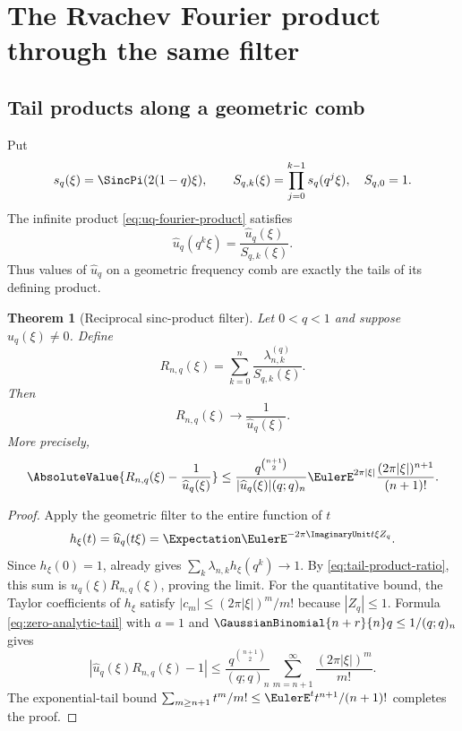 \documentclass[11pt,a4paper,oneside]{article}
\newtheorem{theorem}{Theorem}[section]
\theoremstyle{definition}
\theoremstyle{remark}
\begin{document}
\section{The Rvachev Fourier product through the same filter}
\label{sec:rvachev-filter}

\subsection{Tail products along a geometric comb}

Put
\begin{equation}
 s_q(\xi)=\SincPi(2(1-q)\xi),
 \qquad
 S_{q,k}(\xi)=\prod_{j=0}^{k-1}s_q(q^j\xi),
 \quad S_{q,0}=1.
 \label{eq:prefix-products}
\end{equation}
The infinite product \eqref{eq:uq-fourier-product} satisfies
\begin{equation}
 \widehat u_q(q^k\xi)
 =\frac{\widehat u_q(\xi)}{S_{q,k}(\xi)}.
 \label{eq:tail-product-ratio}
\end{equation}
Thus values of $\widehat u_q$ on a geometric frequency comb are exactly the
tails of its defining product.

\begin{theorem}[Reciprocal sinc-product filter]
\label{thm:reciprocal-product}
Let $0<q<1$ and suppose $\widehat u_q(\xi)\ne0$.  Define
\begin{equation}
 R_{n,q}(\xi)=\sum_{k=0}^n
 \frac{\lambda_{n,k}^{(q)}}{S_{q,k}(\xi)}.
 \label{eq:reciprocal-approximant}
\end{equation}
Then
\begin{equation}
 R_{n,q}(\xi)\longrightarrow\frac1{\widehat u_q(\xi)}.
 \label{eq:reciprocal-limit}
\end{equation}
More precisely,
\begin{equation}
 \AbsoluteValue{R_{n,q}(\xi)-\frac1{\widehat u_q(\xi)}}
 \le
 \frac{q^{\binom{n+1}{2}}}{|\widehat u_q(\xi)|(q;q)_n}
 \EulerE^{2\pi|\xi|}\frac{(2\pi|\xi|)^{n+1}}{(n+1)!}.
 \label{eq:reciprocal-error-bound}
\end{equation}
\end{theorem}

\begin{proof}
Apply the geometric filter to the entire function of $t$
\[
 h_\xi(t)=\widehat u_q(t\xi)=\Expectation\EulerE^{-2\pi\ImaginaryUnit t\xi Z_q}.
\]
Since $h_\xi(0)=1$,  already gives
$\sum_k\lambda_{n,k}h_\xi(q^k)\to1$.  By
\eqref{eq:tail-product-ratio}, this sum is
$\widehat u_q(\xi)R_{n,q}(\xi)$, proving the limit.
For the quantitative bound, the Taylor coefficients of $h_\xi$ satisfy
$|c_m|\le(2\pi|\xi|)^m/m!$ because $|Z_q|\le1$.  Formula
\eqref{eq:zero-analytic-tail} with $a=1$ and
$\GaussianBinomial{n+r}{n}q\le1/(q;q)_n$ gives
\[
 |\widehat u_q(\xi)R_{n,q}(\xi)-1|
 \le\frac{q^{\binom{n+1}{2}}}{(q;q)_n}
 \sum_{m=n+1}^\infty\frac{(2\pi|\xi|)^m}{m!}.
\]
The exponential-tail bound
$\sum_{m\ge n+1}t^m/m!\le\EulerE^t t^{n+1}/(n+1)!$ completes the proof.
\end{proof}
\end{document}
